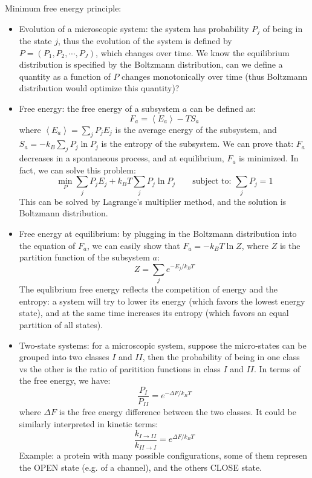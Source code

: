 \documentclass{report}
\begin{document}
\begin{enumerate}
Minimum free energy principle:  
\begin{itemize}
\item Evolution of a microscopic system: the system has probability $P_j$ of being in the state $j$, thus the evolution of the system is defined by $P = (P_1, P_2, \cdots, P_J)$, which changes over time. We know the equilibrium distribution is specified by the Boltzmann distribution, can we define a quantity as a function of $P$ changes monotonically over time (thus Boltzmann distribution would optimize this quantity)? 

\item Free energy: the free energy of a subsystem $a$ can be defined as: 
\begin{equation}
F_a = \left\langle E_a \right\rangle - T S_a
\end{equation}
where $\left\langle E_a \right\rangle = \sum_j P_j E_j$ is the average energy of the subsystem, and $S_a = -k_B \sum_j P_j \ln P_j$ is the entropy of the subsystem. We can prove that: $F_a$ decreases in a spontaneous process, and at equilibrium, $F_a$ is minimized. In fact, we can solve this problem: 
\begin{equation}
\min_P \sum_j P_j E_j + k_B T \sum_j P_j \ln P_j \qquad \text{subject to: } \sum_j P_j = 1 	
\end{equation}
This can be solved by Lagrange's multiplier method, and the solution is Boltzmann distribution. 

\item Free energy at equilibrium: by plugging in the Boltzmann distribution into the equation of $F_a$, we can easily show that $F_a = -k_B T \ln Z$, where $Z$ is the partition function of the subsystem $a$: 
\begin{equation}
Z = \sum_j e^{-E_j / k_B T}	
\end{equation}
The equlibrium free energy reflects the competition of energy and the entropy: a system will try to lower its energy (which favors the lowest energy state), and at the same time increases its entropy (which favors an equal partition of all states). 

\item Two-state systems: for a microscopic system, suppose the micro-states can be grouped into two classes $I$ and $II$, then the probability of being in one class vs the other is the ratio of paritition functions in class $I$ and $II$. In terms of the free energy, we have:   
\begin{equation}
\frac{P_I}{P_{II}} = e^{-\Delta F/ k_B T}
\end{equation}
where $\Delta F$ is the free energy difference between the two classes. It could be similarly interpreted in kinetic terms: 
\begin{equation}
\frac{k_{I \rightarrow II}}{k_{II \rightarrow I}} = e^{\Delta F/ k_B T}
\end{equation}
Example: a protein with many possible configurations, some of them represen the OPEN state (e.g. of a channel), and the others CLOSE state. 
\end{itemize}

\end{enumerate}
\end{document}
